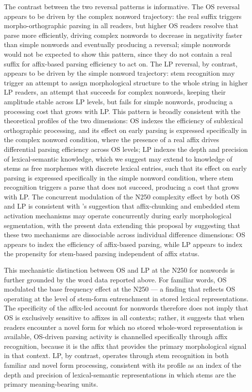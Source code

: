 \documentclass[utf8]{FrontiersinHarvard} %
\begin{document}
	The contrast between the two reversal patterns is informative. The OS reversal appears to be driven by the complex nonword trajectory: the real suffix triggers morpho-orthographic parsing in all readers, but higher OS readers resolve that parse more efficiently, driving complex nonwords to decrease in negativity faster than simple nonwords and eventually producing a reversal; simple nonwords would not be expected to show this pattern, since they do not contain a real suffix for affix-based parsing efficiency to act on. The LP reversal, by contrast, appears to be driven by the simple nonword trajectory: stem recognition may trigger an attempt to assign morphological structure to the whole string in higher LP readers, an attempt that succeeds for complex nonwords, keeping their amplitude stable across LP levels, but fails for simple nonwords, producing a processing cost that grows with LP. This pattern is broadly consistent with the theoretical profiles of the two dimensions: OS indexes the efficiency of sublexical orthographic processing, and its effect on early parsing is expressed specifically in the complex nonword condition, where the presence of a real affix drives differential parsing efficiency across OS levels; LP indexes the depth and precision of lexical-semantic knowledge, which we suggest may extend to knowledge of stems as free morphemes with discrete lexical entries, such that its effect on early parsing is expressed specifically in the simple nonword condition, where stem recognition triggers a parse that does not succeed, producing a cost that grows with LP. The concurrent modulation of the N250 complexity effect by both OS and LP is consistent with \citet{beyersmannEmbeddedStemPriming2016}'s suggestion that affix-chunking and embedded stem activation mechanisms may operate concurrently during early morphological segmentation, with the present data extending this proposal by suggesting that these two mechanisms are dissociable across individual difference dimensions: OS appears to index the efficiency of affix-based parsing, while LP appears to index the propensity for stem-based parsing independent of affix status.
	
	This mechanistic distinction between OS and LP at the N250 for nonwords is further grounded by the word data reported above. For familiar words, OS modulated the base frequency effect at the N250 --- a finding that reflects OS operating at the level of stem-form entrenchment in stored lexical representations. The specificity of the affix-led account for nonwords therefore does not imply that OS is exclusively sensitive to affixes in all contexts; rather, it suggests that when readers encounter a novel form for which no stored whole-word representation is available, OS-driven parsing activity is channelled specifically through affix recognition, because it is the affix that provides the primary morphological signal in that context. LP, by contrast, operates through stem recognition in both familiar and novel form processing, consistent with its profile as an index of the depth and precision of lexical-semantic representations in which stems are the primary meaning-bearing units.
	
\end{document}
